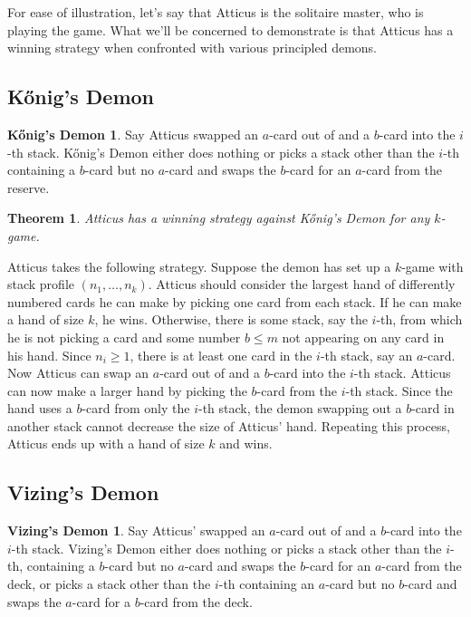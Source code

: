 \documentclass[12pt]{article}
\theoremstyle{plain}
\newtheorem{thm}{Theorem}
\theoremstyle{definition}
\newtheorem*{konig_demon}{K\H{o}nig's Demon}
\newtheorem*{vizing_demon}{Vizing's Demon}
\theoremstyle{remark}
\begin{document}
For ease of illustration, let's say that Atticus is the solitaire master, who is playing the game. What we'll be concerned to demonstrate is that Atticus has a winning strategy when confronted with various principled demons.

\subsection{K\H{o}nig's Demon}

\begin{konig_demon}
Say Atticus swapped an $a$-card out of and a $b$-card into the $i$-th stack.
K\H{o}nig's Demon either does nothing or picks a stack other than the $i$-th containing a $b$-card but no $a$-card and swaps the $b$-card for an $a$-card from the reserve.
\end{konig_demon}

\begin{thm}
Atticus has a winning strategy against K\H{o}nig's Demon for any $k$-game.
\end{thm}

Atticus takes the following strategy.  Suppose the demon has set up a $k$-game with stack profile $(n_1, \ldots, n_k)$.  Atticus should consider the largest hand of differently numbered cards he can make by picking one card from each stack.  If he can make a hand of size $k$, he wins.  Otherwise, there is some stack, say the $i$-th, from which he is not picking a card and some number $b \leq m$ not appearing on any card in his hand.  Since $n_i \geq 1$, there is at least one card in the $i$-th stack, say an $a$-card.  Now Atticus can swap an $a$-card out of and a $b$-card into the $i$-th stack.  Atticus can now make a larger hand by picking the $b$-card from the $i$-th stack.  Since the hand uses a $b$-card from only the $i$-th stack, the demon swapping out a $b$-card in another stack cannot decrease the size of Atticus' hand.  Repeating this process, Atticus ends up with a hand of size $k$ and wins.

\subsection{Vizing's Demon}

\begin{vizing_demon}
Say Atticus' swapped an $a$-card out of and a $b$-card into the $i$-th stack.
Vizing's Demon either does nothing or picks a stack other than the $i$-th, containing a $b$-card but no $a$-card and swaps the $b$-card for an $a$-card from the deck, or picks a stack other than the $i$-th containing an $a$-card but no $b$-card and swaps the $a$-card for a $b$-card from the deck.
\end{vizing_demon}
\end{document}
